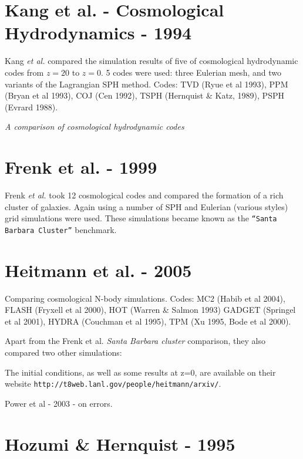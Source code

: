 
\section{Kang et al. - Cosmological Hydrodynamics - 1994}



Kang {\it et al. } compared the simulation results of five
of cosmological hydrodynamic codes from $z=20$ to $z=0$. 5 codes
were used: three Eulerian mesh, and two variants of the
Lagrangian SPH method.
Codes: 
TVD (Ryue et al 1993),
PPM (Bryan et al 1993),
COJ (Cen 1992),
TSPH (Hernquist \& Katz, 1989),
PSPH (Evrard 1988).

{\it A comparison of cosmological hydrodynamic codes}

\section{Frenk  et al. - 1999}

Frenk {\it et al. } took 12 cosmological codes and compared the
formation of a rich cluster of galaxies.
Again using a number of SPH and
Eulerian (various styles) grid simulations were used.
\smallskip
These simulations became known as the {\tt ``Santa Barbara Cluster''}
benchmark.

\section{Heitmann et al. - 2005}

Comparing cosmological N-body simulations. Codes:
MC2 (Habib et al 2004), %
FLASH (Fryxell et al 2000),
HOT (Warren \& Salmon 1993) %
GADGET (Springel et al 2001),
HYDRA (Couchman et al 1995),
TPM (Xu 1995, Bode et al 2000).

Apart from the Frenk et al. {\it Santa Barbara cluster} comparison, they
also compared two other simulations:

The initial conditions, as well as some results at z=0, are available
on their website {\tt http://t8web.lanl.gov/people/heitmann/arxiv/}.

Power et al - 2003 - on errors.


\section{Hozumi \& Hernquist - 1995}

